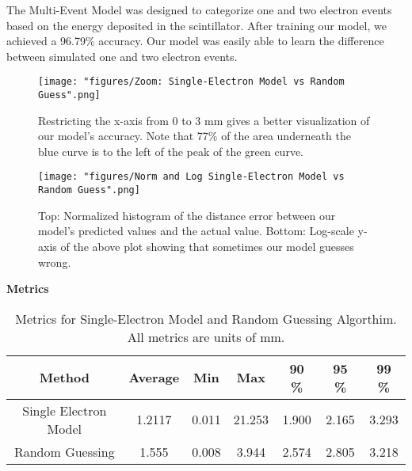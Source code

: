 \documentclass[12pt]{article}
\begin{document}
The Multi-Event Model was designed to categorize one and two electron events based on the energy deposited in the scintillator. After training our model, we achieved a 96.79\% accuracy. Our model was easily able to learn the difference between simulated one and two electron events. 

\begin{figure}[H]
    \centering
    \texttt{[image: "figures/Zoom: Single-Electron Model vs Random Guess".png]}
    \caption{Restricting the x-axis from 0 to 3 mm gives a better visualization of our model's accuracy. Note that 77\% of the area underneath the blue curve is to the left of the peak of the green curve.}
    \label{fig:zoomsinglemodelpredictions}
\end{figure}


\begin{figure}[H]
    \centering
    \texttt{[image: "figures/Norm and Log Single-Electron Model vs Random Guess".png]}
    \caption{Top: Normalized histogram of the distance error between our model's predicted values and the actual value. Bottom: Log-scale y-axis of the above plot showing that sometimes our model guesses wrong.}
    \label{fig:singlemodelpredictions}
\end{figure}



\begin{center}
{\large {\bf Metrics}}
\end{center}

\begin{table}[h]
    
    \centering
    \begin{tabular}{c|c|c|c|c|c|c}
    \hline\hline
    {\bf Method}          & {\bf Average} & {\bf Min}   & {\bf Max }   & {\bf 90 \% }  &  {\bf 95 \%} & {\bf 99 \% }\\[1ex]
    \hline
    Single Electron Model & 1.2117 & 0.011	& 21.253 & 1.900	& 2.165	 & 3.293\\[1ex]
    
    Random Guessing       & 1.555  & 0.008	& 3.944	 & 2.574	& 2.805  & 3.218\\ [1ex]
    \hline
    \end{tabular}
    \caption{Metrics for Single-Electron Model and Random Guessing Algorthim. All metrics are units of mm.}
    \label{tab:metric}
\end{table}
\newpage
\end{document}

